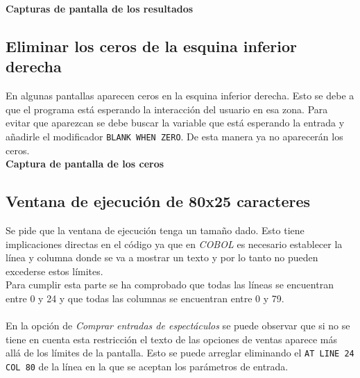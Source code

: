 \documentclass[10pt,a4paper]{article}
\begin{document}
\textbf{{\Huge Capturas de pantalla de los resultados}}

\subsection{Eliminar los ceros de la esquina inferior derecha}

En algunas pantallas aparecen ceros en la esquina inferior derecha. Esto se debe a que el programa está esperando la interacción del usuario en esa zona. Para evitar que aparezcan se debe buscar la variable que está esperando la entrada y añadirle el modificador \texttt{BLANK WHEN ZERO}. De esta manera ya no aparecerán los ceros.\\

\textbf{{\Huge Captura de pantalla de los ceros}}

\subsection{Ventana de ejecución de 80x25 caracteres}

Se pide que la ventana de ejecución tenga un tamaño dado. Esto tiene implicaciones directas en el código ya que en \emph{COBOL} es necesario establecer la línea y columna donde se va a mostrar un texto y por lo tanto no pueden excederse estos límites.\\
Para cumplir esta parte se ha comprobado que todas las líneas se encuentran entre 0 y 24 y que todas las columnas se encuentran entre 0 y 79.\\
\\
En la opción de \emph{Comprar entradas de espectáculos} se puede observar que si no se tiene en cuenta esta restricción el texto de las opciones de ventas aparece más allá de los límites de la pantalla. Esto se puede arreglar eliminando el \texttt{AT LINE 24 COL 80} de la línea en la que se aceptan los parámetros de entrada.
\end{document}
